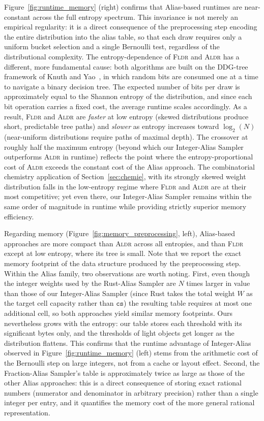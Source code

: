 Figure~\ref{fig:runtime_memory} (right) confirms that Alias-based runtimes are near-constant across the full entropy spectrum. This invariance is not merely an empirical regularity: it is a direct consequence of the preprocessing step encoding the entire distribution into the alias table, so that each draw requires only a uniform bucket selection and a single Bernoulli test, regardless of the distributional complexity. The entropy-dependence of \textsc{Fldr} and \textsc{Aldr} has a different, more fundamental cause: both algorithms are built on the DDG-tree framework of Knuth and Yao~\cite{KY76}, in which random bits are consumed one at a time to navigate a binary decision tree. The expected number of bits per draw is approximately equal to the Shannon entropy of the distribution, and since each bit operation carries a fixed cost, the average runtime scales accordingly. As a result, \textsc{Fldr} and \textsc{Aldr} are \emph{faster} at low entropy (skewed distributions produce short, predictable tree paths) and \emph{slower} as entropy increases toward $\log_2(N)$ (near-uniform distributions require paths of maximal depth). The crossover at roughly half the maximum entropy (beyond which our Integer-Alias Sampler outperforms \textsc{Aldr} in runtime) reflects the point where the entropy-proportional cost of \textsc{Aldr} exceeds the constant cost of the Alias approach. The combinatorial chemistry application of Section~\ref{sec:chemie}, with its strongly skewed weight distribution falls in the low-entropy regime where \textsc{Fldr} and \textsc{Aldr} are at their most competitive; yet even there, our Integer-Alias Sampler remains within the same order of magnitude in runtime while providing strictly superior memory efficiency.

Regarding memory (Figure~\ref{fig:memory_preprocessing}, left), Alias-based approaches are more compact than \textsc{Aldr} across all entropies, and than \textsc{Fldr} except at low entropy, where its tree is small. Note that we report the exact memory footprint of the data structure produced by the preprocessing step. Within the Alias family, two observations are worth noting. First, even though the integer weights used by the Rust-Alias Sampler are $N$ times larger in value than those of our Integer-Alias Sampler (since Rust takes the total weight $W$ as the target cell capacity rather than $\mathtt{cs}$) the resulting table requires at most one additional cell, so both approaches yield similar memory footprints. Ours nevertheless grows with the entropy: our table stores each threshold with its significant bytes only, and the thresholds of light objects get longer as the distribution flattens. This confirms that the runtime advantage of Integer-Alias observed in Figure~\ref{fig:runtime_memory} (left) stems from the arithmetic cost of the Bernoulli step on large integers, not from a cache or layout effect. Second, the Fraction-Alias Sampler's table is approximately twice as large as those of the other Alias approaches: this is a direct consequence of storing exact rational numbers (numerator and denominator in arbitrary precision) rather than a single integer per entry, and it quantifies the memory cost of the more general rational representation.

